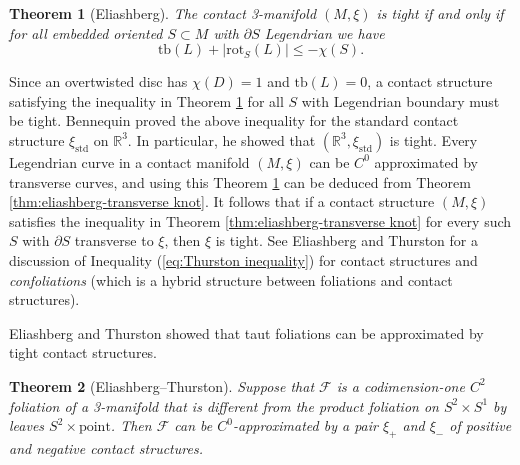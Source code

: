 \documentclass[11pt]{amsart}
\newtheorem{thm}{Theorem}[section]
\theoremstyle{remark}
\theoremstyle{definition}
\begin{document}
	\begin{thm}[Eliashberg]
		The contact 3-manifold $(M , \xi)$ is tight if and only if for all embedded oriented $S \subset M$ with $\partial S$ Legendrian we have 
		\[ \mathrm{tb}(L) + |\mathrm{rot}_S(L)| \leq - \chi(S). \]
		\label{thm:eliashberg-Legendrian knot}
	\end{thm}

	Since an overtwisted disc has $\chi(D) =1$ and $\mathrm{tb}(L)=0$, a contact structure satisfying the inequality in Theorem \ref{thm:eliashberg-Legendrian knot} for all $S$ with Legendrian boundary must be tight. Bennequin proved the above inequality for the standard contact structure $\xi_{\mathrm{std}}$ on $\mathbb{R}^3$. In particular, he showed that $(\mathbb{R}^3, \xi_{\mathrm{std}})$ is tight. Every Legendrian curve in a contact manifold $(M , \xi)$ can be $C^0$ approximated by transverse curves, and using this Theorem \ref{thm:eliashberg-Legendrian knot} can be deduced from Theorem \ref{thm:eliashberg-transverse knot}. It follows that if a contact structure $(M , \xi)$ satisfies the inequality in Theorem \ref{thm:eliashberg-transverse knot} for every such $S$ with $\partial S$ transverse to $\xi$, then $\xi$ is tight. See Eliashberg and Thurston \cite[Section 3.3]{eliashberg1998confoliations} for a discussion of Inequality (\ref{eq:Thurston inequality}) for contact structures and \emph{confoliations} (which is a hybrid structure between foliations and contact structures).  

	Eliashberg and Thurston \cite[Theorem 2.4.1]{eliashberg1998confoliations} showed that taut foliations can be approximated by tight contact structures. 
	
	\begin{thm}[Eliashberg--Thurston]
		Suppose that $\mathcal{F}$ is a codimension-one $C^2$ foliation of a 3-manifold that is different from the product foliation on $S^2 \times S^1$ by leaves $S^2 \times \text{point}$. Then $\mathcal{F}$ can be $C^0$-approximated by a pair $\xi_+$ and $\xi_-$ of positive and negative contact structures. 
	\end{thm}
\end{document}
